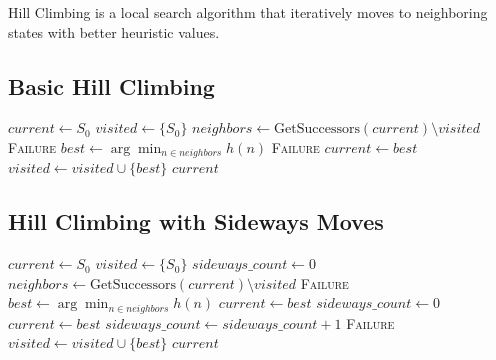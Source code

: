 \documentclass[12pt,a4paper]{article}
\begin{document}
Hill Climbing is a local search algorithm that iteratively moves to neighboring states with better heuristic values.

\subsection{Basic Hill Climbing}

\begin{algorithm}
\caption{Hill Climbing Search}
\begin{algorithmic}[1]
    \State $current \gets S_0$
    \State $visited \gets \{S_0\}$
        \State $neighbors \gets \text{GetSuccessors}(current) \setminus visited$
            \State \Return \textsc{Failure}
        \EndIf
        \State $best \gets \arg\min_{n \in neighbors} h(n)$
            \State \Return \textsc{Failure}
        \EndIf
        \State $current \gets best$
        \State $visited \gets visited \cup \{best\}$
    \EndWhile
    \State \Return $current$
\EndProcedure
\end{algorithmic}
\end{algorithm}

\subsection{Hill Climbing with Sideways Moves}

\begin{algorithm}
\caption{Hill Climbing with Sideways Moves}
\begin{algorithmic}[1]
    \State $current \gets S_0$
    \State $visited \gets \{S_0\}$
    \State $sideways\_count \gets 0$
        \State $neighbors \gets \text{GetSuccessors}(current) \setminus visited$
            \State \Return \textsc{Failure}
        \EndIf
        \State $best \gets \arg\min_{n \in neighbors} h(n)$
            \State $current \gets best$
            \State $sideways\_count \gets 0$
            \State $current \gets best$
            \State $sideways\_count \gets sideways\_count + 1$
        \Else
            \State \Return \textsc{Failure}
        \EndIf
        \State $visited \gets visited \cup \{best\}$
    \EndWhile
    \State \Return $current$
\EndProcedure
\end{algorithmic}
\end{algorithm}
\end{document}
